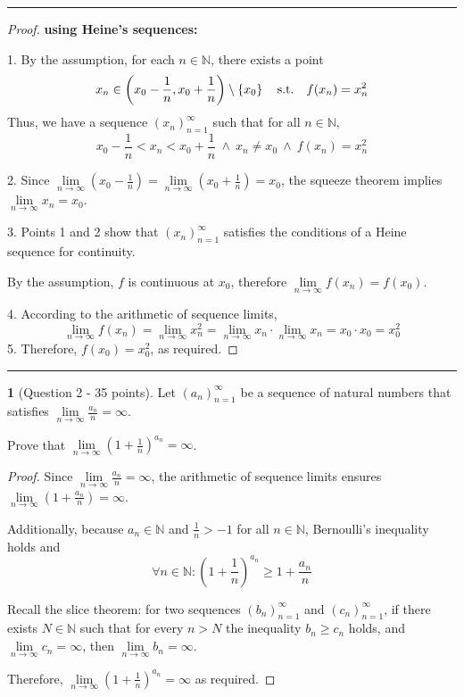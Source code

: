 \documentclass[english]{article}
\theoremstyle{definition}
\newtheorem*{problem*}{\protect\problemname}
\newcommand{\limi}{\underset{n\rightarrow\infty}{\lim}}
\providecommand{\problemname}{Problem}
\begin{document}
\rule[0.5ex]{1\columnwidth}{1pt}

\medskip{}

\begin{proof}
\textbf{using Heine's sequences:}\medskip{}

1. By the assumption, for each $n\in\mathbb{N}$, there exists a point
\[
x_{n}\in\left(x_{0}-\frac{1}{n},x_{0}+\frac{1}{n}\right)\setminus\left\{ x_{0}\right\} \quad\text{s.t.\ensuremath{\quad}}f(x_{n})=x_{n}^{2}
\]
Thus, we have a sequence $\left(x_{n}\right)_{n=1}^{\infty}$ such
that for all $n\in\mathbb{N},$ 
\[
x_{0}-\frac{1}{n}<x_{n}<x_{0}+\frac{1}{n}\ \wedge\ x_{n}\ne x_{0}\ \wedge\ f(x_{n})=x_{n}^{2}
\]

2. Since $\underset{n\rightarrow\infty}{\lim}\left(x_{0}-\frac{1}{n}\right)=\underset{n\rightarrow\infty}{\lim}\left(x_{0}+\frac{1}{n}\right)=x_{0}$,
the squeeze theorem implies $\underset{n\rightarrow\infty}{\lim}x_{n}=x_{0}$.

3. Points 1 and 2 show that $\left(x_{n}\right)_{n=1}^{\infty}$ satisfies
the conditions of a Heine sequence for continuity.

By the assumption, $f$ is continuous at $x_{0}$, therefore $\underset{n\rightarrow\infty}{\lim}f(x_{n})=f(x_{0})$.

4. According to the arithmetic of sequence limits,
\[
\underset{n\rightarrow\infty}{\lim}f(x_{n})=\underset{n\rightarrow\infty}{\lim}x_{n}^{2}=\underset{n\rightarrow\infty}{\lim}x_{n}\cdot\underset{n\rightarrow\infty}{\lim}x_{n}=x_{0}\cdot x_{0}=x_{0}^{2}
\]
 5. Therefore, $f(x_{0})=x_{0}^{2}$, as required. 
\end{proof}
\medskip{}

\rule[0.5ex]{1\columnwidth}{1pt}

\medskip{}

\begin{problem*}[Question 2 - 35 points]
 Let $(a_{n})_{n=1}^{\infty}$ be a sequence of natural numbers that
satisfies $\limi\frac{a_{n}}{n}=\infty$.

Prove that $\limi\left(1+\frac{1}{n}\right)^{a_{n}}=\infty$.
\end{problem*}
\begin{proof}
Since $\limi\frac{a_{n}}{n}=\infty$, the arithmetic of sequence limits
ensures $\limi\left(1+\frac{a_{n}}{n}\right)=\infty$.

Additionally, because $a_{n}\in\mathbb{N}$ and $\frac{1}{n}>-1$
for all $n\in\mathbb{N}$, Bernoulli's inequality holds and 
\[
\forall n\in\mathbb{N}:\left(1+\frac{1}{n}\right)^{a_{n}}\ge1+\frac{a_{n}}{n}
\]

Recall the slice theorem: for two sequences $(b_{n})_{n=1}^{\infty}$
and $(c_{n})_{n=1}^{\infty}$, if there exists $N\in\mathbb{N}$ such
that for every $n>N$ the inequality $b_{n}\ge c_{n}$ holds, and
$\limi c_{n}=\infty$, then $\limi b_{n}=\infty$. 

Therefore, $\limi\left(1+\frac{1}{n}\right)^{a_{n}}=\infty$ as required. 
\end{proof}
\end{document}
